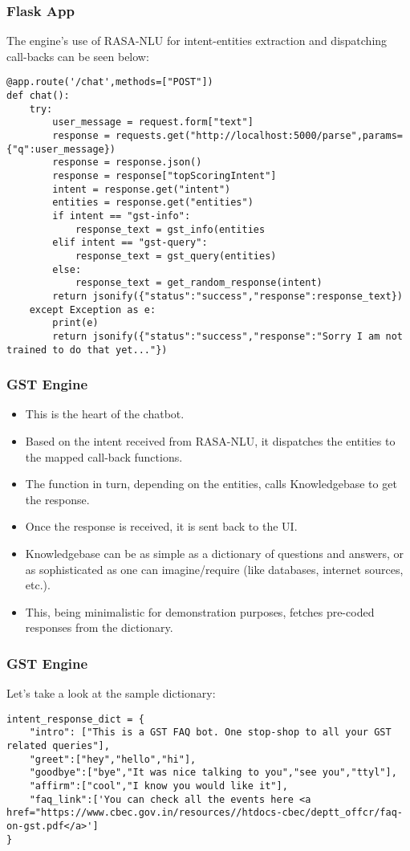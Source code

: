  \begin{frame}[fragile]\frametitle{Flask App}
The engine's use of RASA-NLU for intent-entities extraction and dispatching call-backs can be seen below:
\scriptsize
\begin{lstlisting}
@app.route('/chat',methods=["POST"])
def chat():
    try:
        user_message = request.form["text"]
        response = requests.get("http://localhost:5000/parse",params={"q":user_message})
        response = response.json()
        response = response["topScoringIntent"]
        intent = response.get("intent")
        entities = response.get("entities")
        if intent == "gst-info":
            response_text = gst_info(entities
        elif intent == "gst-query":
            response_text = gst_query(entities)
        else:
            response_text = get_random_response(intent)
        return jsonify({"status":"success","response":response_text})
    except Exception as e:
        print(e)
        return jsonify({"status":"success","response":"Sorry I am not trained to do that yet..."})
\end{lstlisting}
\end{frame}

 \begin{frame}[fragile]\frametitle{GST Engine}
\begin{itemize}
\item This is the heart of the chatbot. 
\item Based on the intent received from RASA-NLU, it dispatches the entities to the mapped call-back functions. 
\item The function in turn, depending on the entities, calls Knowledgebase to get the response. 
\item Once the response is received, it is sent back to the UI.
\item Knowledgebase can be as simple as a dictionary of questions and answers, or as sophisticated as one can imagine/require (like databases, internet sources, etc.). 
\item This, being minimalistic for demonstration purposes, fetches pre-coded responses from the dictionary.
\end{itemize}

\end{frame}

 \begin{frame}[fragile]\frametitle{GST Engine}
 Let's take a look at the sample dictionary:

\scriptsize
\begin{lstlisting}
intent_response_dict = {
    "intro": ["This is a GST FAQ bot. One stop-shop to all your GST related queries"],
    "greet":["hey","hello","hi"],
    "goodbye":["bye","It was nice talking to you","see you","ttyl"],
    "affirm":["cool","I know you would like it"],
    "faq_link":['You can check all the events here <a href="https://www.cbec.gov.in/resources//htdocs-cbec/deptt_offcr/faq-on-gst.pdf</a>']
}
\end{lstlisting}
\end{frame}

